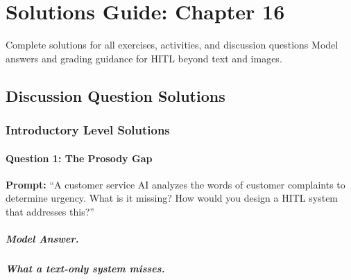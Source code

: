 
\chapter{Solutions Guide: Chapter 16}
\label{ch:solutions-ch16}

\begin{chapterquote}{Complete solutions for all exercises, activities, and discussion questions}
Model answers and grading guidance for HITL beyond text and images.
\end{chapterquote}

\section{Discussion Question Solutions}

\subsection{Introductory Level Solutions}

\subsubsection{Question 1: The Prosody Gap}

\textbf{Prompt:} ``A customer service AI analyzes the words of customer complaints to determine urgency. What is it missing? How would you design a HITL system that addresses this?''

\paragraph{Model Answer.}

\paragraph{What a text-only system misses.}

